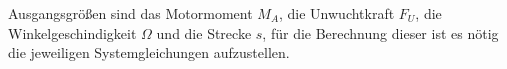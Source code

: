 
\label{Einleitung}

Ausgangsgrößen sind das Motormoment $M_A$, die Unwuchtkraft $F_U$, die Winkelgeschindigkeit $\Omega$ und die Strecke $s$, für die Berechnung dieser ist es nötig die jeweiligen Systemgleichungen aufzustellen.

